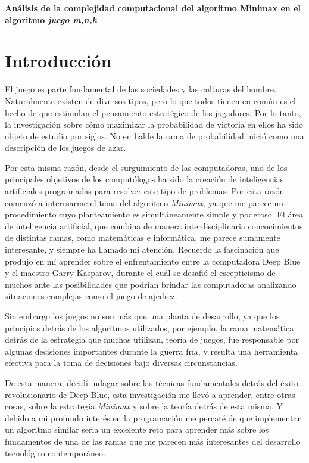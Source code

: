 \Large{\textbf{Análisis de la complejidad computacional del algoritmo Minimax en el algoritmo \emph{juego m,n,k}}}

\normalsize
\section{Introducción}
El juego es parte fundamental de las sociedades y las culturas del hombre.
Naturalmente existen de diversos tipos, pero lo que todos tienen en común es el
hecho de que estimulan el pensamiento estratégico de  los jugadores. Por lo
tanto, la investigación sobre cómo maximizar la probabilidad de victoria en
ellos ha sido objeto de estudio por siglos. No en balde la rama de probabilidad
inició como una descripción de los juegos de azar. 

Por esta misma razón, desde el surguimiento de las computadoras, uno de los
principales objetivos de los computólogos ha sido la creación de inteligencias
artificiales programadas para resolver este tipo de problemas. Por esta razón
comenzó a interesarme el tema del algoritmo \emph{Minimax}, ya que me parece un
procedimiento cuyo planteamiento es simultáneamente simple y poderoso. El área
de inteligencia artificial, que combina de manera interdisciplinaria
concocimientos de distintas ramas, como matemáticas e informática, me parece
sumamente interesante, y siempre ha llamado mi atención. Recuerdo la fascinación
que produjo en mí aprender sobre el enfrentamiento entre la computadora Deep
Blue y el maestro Garry Kasparov, durante el cuál se desafió el escepticismo de
muchos ante las posibilidades que podrían brindar las computadoras analizando
situaciones complejas como el juego de ajedrez. 

Sin embargo los juegos no son más que una planta de desarrollo, ya que los
principios detrás de los algoritmos utilizados, por ejemplo, la rama
matemática detrás de la estrategia que muchos utilizan, teoría de juegos, fue responsable por algunas
decisiones importantes durante la guerra fría, y resulta una herramienta
efectiva para la toma de decisiones bajo diversas circunstancias. 

De esta manera, decidí indagar sobre las técnicas fundamentales detrás del éxito
revolucionario de Deep Blue, esta investigación me llevó a aprender, entre otras
cosas, sobre la
estrategia \emph{Minimax} y sobre la teoría detrás de esta misma. Y debido a  mi profundo interés en
la programación me percaté de que implementar un algoritmo similar seria un
excelente reto para aprender más sobre los fundamentos de una de las ramas que
me parecen más interesantes del desarrollo tecnológico contemporáneo. 


